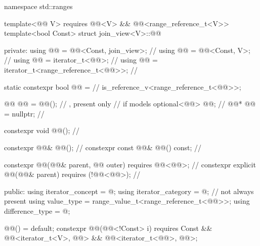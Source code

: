 %
\begin{codeblock}
namespace std::ranges {
  template<@@ V>
    requires @@<V> && @@<range_reference_t<V>>
  template<bool Const>
  struct join_view<V>::@@ {
  private:
    using @@    = @@<Const, join_view>;            // \expos
    using @@      = @@<Const, V>;                    // \expos
    using @@ = iterator_t<@@>;                         // \expos
    using @@ = iterator_t<range_reference_t<@@>>;      // \expos

    static constexpr bool @@ =                      // \expos
      is_reference_v<range_reference_t<@@>>;

    @@ @@ = @@();                     // \expos, present only
                                                        // if  models 
    optional<@@> @@;                                 // \expos
    @@* @@  = nullptr;                                 // \expos

    constexpr void @@();                                   // \expos

    constexpr @@& @@();                               // \expos
    constexpr const @@& @@() const;                   // \expos

    constexpr @@(@@& parent, @@ outer)
      requires @@<@@>;                             // \expos
    constexpr explicit @@(@@& parent)
      requires (!@@<@@>);                          // \expos

  public:
    using iterator_concept  = @\seebelow@;
    using iterator_category = @\seebelow@;                        // not always present
    using value_type        = range_value_t<range_reference_t<@@>>;
    using difference_type   = @\seebelow@;

    @@() = default;
    constexpr @@(@@<!Const> i)
      requires Const &&
               @@<iterator_t<V>, @@> &&
               @@<iterator_t<@@>, @@>;

}}
\end{codeblock}
